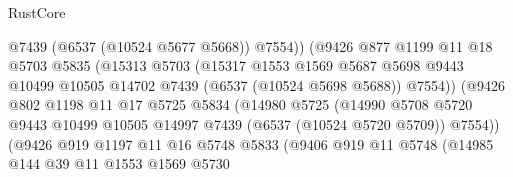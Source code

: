 \begin{lexlean}{RustCore}
\begin{coremodule}
                                  @7439
                                  (@6537 (@10524 @5677 @5668))
                                  @7554))
                              (@9426
                                @877
                                @1199
                                @11
                                @18
                                @5703
                                @5835
                                (@15313
                                  @5703
                                  (@15317
                                    @1553
                                    @1569
                                    @5687
                                    @5698
                                    @9443
                                    @10499
                                    @10505
                                    @14702
                                    @7439
                                    (@6537 (@10524 @5698 @5688))
                                    @7554))
                                (@9426
                                  @802
                                  @1198
                                  @11
                                  @17
                                  @5725
                                  @5834
                                  (@14980
                                    @5725
                                    (@14990
                                      @5708
                                      @5720
                                      @9443
                                      @10499
                                      @10505
                                      @14997
                                      @7439
                                      (@6537 (@10524 @5720 @5709))
                                      @7554))
                                  (@9426
                                    @919
                                    @1197
                                    @11
                                    @16
                                    @5748
                                    @5833
                                    (@9406
                                      @919
                                      @11
                                      @5748
                                      (@14985
                                        @144
                                        @39
                                        @11
                                        @1553
                                        @1569
                                        @5730

\end{coremodule}
\end{lexlean}
